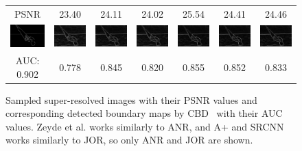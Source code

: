 \documentclass[10pt,twocolumn,letterpaper]{article}
\begin{document}
\begin{figure} [tb]
\begin{tabular*}{0.5\textwidth}{ccccccc}
  PSNR & 23.40 & 24.11 & 24.02 & 25.54 & 24.41 & 24.46 \\    
  \hspace{-2mm}
  \includegraphics[width=2cm]{fig/62096_seg.jpg} & \hspace{-4mm}
  \includegraphics[width=2cm]{fig/62096[2-Bicubic]_crisp.jpg} & \hspace{-4mm}
  \includegraphics[width=2cm]{fig/62096[3-Zeyde]_crisp.jpg} & \hspace{-4mm}
  \includegraphics[width=2cm]{fig/62096[4-ANR]_crisp.jpg} & \hspace{-4mm}
  \includegraphics[width=2cm]{fig/62096[5-SRCNN]_crisp.jpg} & \hspace{-4mm}
  \includegraphics[width=2cm]{fig/62096[6-A+]_crisp.jpg} & \hspace{-4mm}
  \includegraphics[width=2cm]{fig/62096[7-JOR]_crisp.jpg} \\
  AUC: 0.902 & 0.778 & 0.845 & 0.820 & 0.855 & 0.852 & 0.833 \\

\end{tabular*}
   \caption{Sampled super-resolved images with their PSNR values and corresponding detected boundary maps by CBD~\cite{isola2014crisp} with their AUC values. Zeyde et al. works similarly to ANR, and A+ and SRCNN works similarly to JOR, so only ANR and JOR are shown. }
\label{fig:ed_cbd}  
\end{figure}
\end{document}

